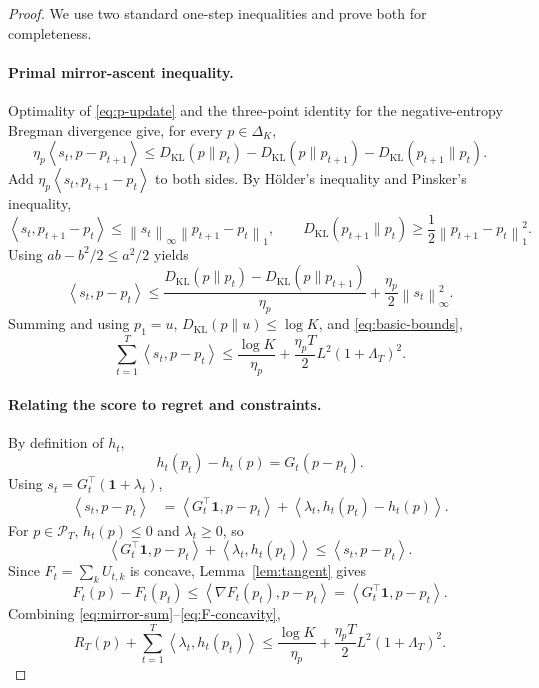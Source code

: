 \documentclass[11pt]{article}
\newcommand{\DeltaK}{\Delta_K}
\newcommand{\KL}{D_{\mathrm{KL}}}
\newcommand{\one}{\mathbf{1}}
\newcommand{\ip}[2]{\left\langle #1,#2\right\rangle}
\newcommand{\norm}[1]{\left\lVert #1\right\rVert}
\begin{document}
\begin{proof}
We use two standard one-step inequalities and prove both for completeness.

\paragraph{Primal mirror-ascent inequality.}
Optimality of \eqref{eq:p-update} and the three-point identity for the negative-entropy Bregman divergence give, for every $p\in\DeltaK$,
\begin{equation}
    \eta_p\ip{s_t}{p-p_{t+1}}
    \le
    \KL(p\|p_t)-\KL(p\|p_{t+1})-\KL(p_{t+1}\|p_t).
    \label{eq:three-point}
\end{equation}
Add $\eta_p\ip{s_t}{p_{t+1}-p_t}$ to both sides. By H\"older's inequality and Pinsker's inequality,
\[
    \ip{s_t}{p_{t+1}-p_t}
    \le
    \norm{s_t}_\infty\norm{p_{t+1}-p_t}_1,
    \qquad
    \KL(p_{t+1}\|p_t)
    \ge
    \frac12\norm{p_{t+1}-p_t}_1^2.
\]
Using $ab-b^2/2\le a^2/2$ yields
\begin{equation}
    \ip{s_t}{p-p_t}
    \le
    \frac{\KL(p\|p_t)-\KL(p\|p_{t+1})}{\eta_p}
    +\frac{\eta_p}{2}\norm{s_t}_\infty^2.
    \label{eq:mirror-one-step}
\end{equation}
Summing and using $p_1=u$, $\KL(p\|u)\le\log K$, and \eqref{eq:basic-bounds},
\begin{equation}
    \sum_{t=1}^T\ip{s_t}{p-p_t}
    \le
    \frac{\log K}{\eta_p}
    +\frac{\eta_p T}{2}L^2(1+\Lambda_T)^2.
    \label{eq:mirror-sum}
\end{equation}

\paragraph{Relating the score to regret and constraints.}
By definition of $h_t$,
\begin{equation}
    h_t(p_t)-h_t(p)=G_t(p-p_t).
    \label{eq:h-difference}
\end{equation}
Using $s_t=G_t^\top(\one+\lambda_t)$,
\begin{align}
    \ip{s_t}{p-p_t}
    &=
    \ip{G_t^\top\one}{p-p_t}
    +\ip{\lambda_t}{h_t(p_t)-h_t(p)}.
    \label{eq:score-decomp}
\end{align}
For $p\in\mathcal P_T$, $h_t(p)\le0$ and $\lambda_t\ge0$, so
\begin{equation}
    \ip{G_t^\top\one}{p-p_t}
    +\ip{\lambda_t}{h_t(p_t)}
    \le
    \ip{s_t}{p-p_t}.
    \label{eq:drop-safe}
\end{equation}
Since $F_t=\sum_kU_{t,k}$ is concave, Lemma~\ref{lem:tangent} gives
\begin{equation}
    F_t(p)-F_t(p_t)
    \le
    \ip{\nabla F_t(p_t)}{p-p_t}
    =
    \ip{G_t^\top\one}{p-p_t}.
    \label{eq:F-concavity}
\end{equation}
Combining \eqref{eq:mirror-sum}--\eqref{eq:F-concavity},
\begin{equation}
    R_T(p)
    +\sum_{t=1}^T\ip{\lambda_t}{h_t(p_t)}
    \le
    \frac{\log K}{\eta_p}
    +\frac{\eta_p T}{2}L^2(1+\Lambda_T)^2.
    \label{eq:pd-predual}
\end{equation}


\end{proof}
\end{document}
